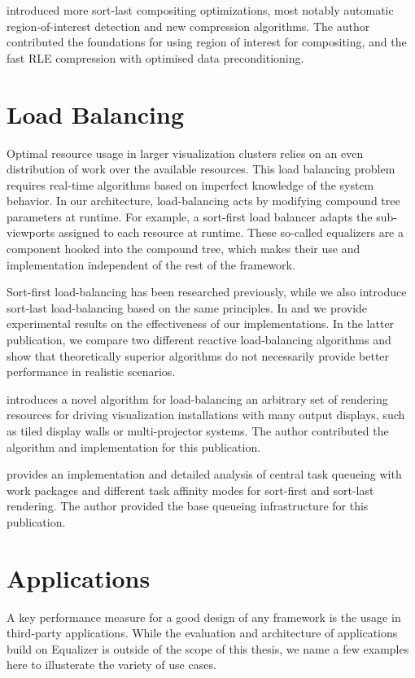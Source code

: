 \cite{MEP:10} introduced more sort-last compositing optimizations, most notably
automatic region-of-interest detection and new compression algorithms. The
author contributed the foundations for using region of interest for compositing,
and the fast RLE compression with optimised data preconditioning.

\section{Load Balancing}

Optimal resource usage in larger visualization clusters relies on an even
distribution of work over the available resources. This load balancing problem
requires real-time algorithms based on imperfect knowledge of the system
behavior. In our architecture, load-balancing acts by modifying compound tree
parameters at runtime. For example, a sort-first load balancer adapts the
sub-viewports assigned to each resource at runtime. These so-called
\textsf{equalizers} are a component hooked into the compound tree, which makes
their use and implementation independent of the rest of the framework.

Sort-first load-balancing has been researched previously, while we also
introduce sort-last load-balancing based on the same principles. In
\cite{EMP:09} and \cite{ESP:18} we provide experimental results on the
effectiveness of our implementations. In the latter publication, we compare two
different reactive load-balancing algorithms and show that theoretically
superior algorithms do not necessarily provide better performance in realistic
scenarios.

\cite{EEP:11} introduces a novel algorithm for load-balancing an arbitrary set
of rendering resources for driving visualization installations with many output
displays, such as tiled display walls or multi-projector systems. The author
contributed the algorithm and implementation for this publication.

\cite{SPEP:16} provides an implementation and detailed analysis of central task
queueing with work packages and different task affinity modes for sort-first and
sort-last rendering. The author provided the   base queueing infrastructure for
this publication.


\section{Applications}

A key performance measure for a good design of any framework is the usage in
third-party applications. While the evaluation and architecture of applications
build on Equalizer is outside of the scope of this thesis, we name a few
examples here to illusterate the variety of use cases.


